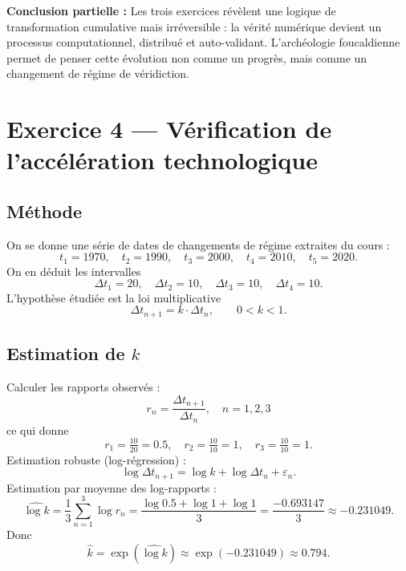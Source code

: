 \documentclass[memoire, 12pt]{report}
\begin{document}
\bigskip
\textbf{Conclusion partielle :}  
Les trois exercices révèlent une logique de transformation cumulative mais irréversible : la vérité numérique devient un processus computationnel, distribué et auto-validant. L’archéologie foucaldienne permet de penser cette évolution non comme un progrès, mais comme un changement de régime de véridiction.

\bigskip



\section{Exercice 4 — Vérification de l'accélération technologique}

\subsection*{Méthode}
On se donne une série de dates de changements de régime extraites du cours :
\[
t_1=1970,\quad t_2=1990,\quad t_3=2000,\quad t_4=2010,\quad t_5=2020.
\]
On en déduit les intervalles
\[
\Delta t_1 = 20,\quad \Delta t_2 = 10,\quad \Delta t_3 = 10,\quad \Delta t_4 = 10.
\]
L'hypothèse étudiée est la loi multiplicative
\[
\Delta t_{n+1} = k\cdot \Delta t_n,\qquad 0<k<1.
\]

\subsection*{Estimation de $k$}
Calculer les rapports observés :
\[
r_n=\frac{\Delta t_{n+1}}{\Delta t_n},\quad n=1,2,3
\]
ce qui donne
\[
r_1=\tfrac{10}{20}=0.5,\quad r_2=\tfrac{10}{10}=1,\quad r_3=\tfrac{10}{10}=1.
\]
Estimation robuste (log-régression) :
\[
\log \Delta t_{n+1} = \log k + \log \Delta t_n + \varepsilon_n.
\]
Estimation par moyenne des log-rapports :
\[
\widehat{\log k} = \frac{1}{3}\sum_{n=1}^3 \log r_n
= \frac{\log 0.5 + \log 1 + \log 1}{3} = \frac{-0.693147}{3} \approx -0.231049.
\]
Donc
\[
\hat{k} = \exp(\widehat{\log k}) \approx \exp(-0.231049)\approx 0.794.
\]
\end{document}
